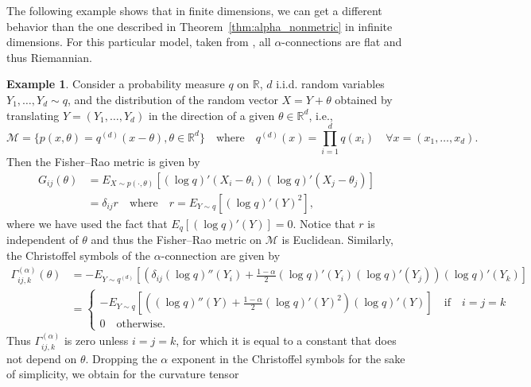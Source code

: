 \documentclass[11pt,reqno]{amsart}
\theoremstyle{definition}
\newtheorem{example}[theorem]{Example}
\newcommand{\R}{\mathbb R}
\begin{document}
The following example shows that in finite dimensions, we can get a different behavior than the one described in Theorem~\ref{thm:alpha_nonmetric} in infinite dimensions. For this particular model, taken from \cite{amari2000methods}, all $\alpha$-connections are flat and thus Riemannian.
\begin{example}\label{ex:finite-dim}
Consider a probability measure $q$ on $\R$, $d$ i.i.d. random variables $Y_1,\hdots,Y_d\sim q$, and the distribution of the random vector $X=Y+\theta$ obtained by translating $Y=(Y_1,\hdots,Y_d)$ in the direction of a given $\theta\in\R^d$, i.e.,
$$\mathcal M=\{p(x,\theta)=q^{(d)}(x-\theta),\theta\in\R^d\}\quad \text{where}\quad q^{(d)}(x)=\prod_{i=1}^dq(x_i) \quad \forall x=(x_1,\hdots,x_d).$$
Then the Fisher--Rao metric is given by
\begin{align*}
G_{ij}(\theta)&=E_{X\sim p(\cdot,\theta)}\left[(\log q)'(X_i-\theta_i)(\log q)'(X_j-\theta_j)\right]\\
&=\delta_{ij}r \quad \text{where} \quad r=E_{Y\sim q}\left[(\log q)'(Y)^2\right],
\end{align*}
where we have used the fact that $E_q\left[(\log q)'(Y)\right]=0$. Notice that $r$ is independent of $\theta$ and thus the Fisher--Rao metric on $\mathcal M$ is Euclidean. Similarly, the Christoffel symbols of the $\alpha$-connection are given by
\begin{align*}
\Gamma_{ij,k}^{(\alpha)}(\theta)&=-E_{Y \sim q^{(d)}}\left[\left(\delta_{ij}(\log q)''(Y_i)+\frac{1-\alpha}{2}(\log q)'(Y_i)(\log q)'(Y_j)\right)(\log q)'(Y_k)\right]\\
&=\begin{cases}
-E_{Y\sim q}\left[\left((\log q)''(Y)+\frac{1-\alpha}{2}(\log q)'(Y)^2\right)(\log q)'(Y)\right] \quad \text{if}\quad i=j=k\\
0 \quad \text{otherwise}.
\end{cases}
\end{align*}
Thus $\Gamma_{ij,k}^{(\alpha)}$ is zero unless $i=j=k$, for which it is equal to a constant that does not depend on $\theta$. Dropping the $\alpha$ exponent in the Christoffel symbols for the sake of simplicity, we obtain for the curvature tensor
\begin{align*}

\end{align*}
\end{example}
\end{document}
